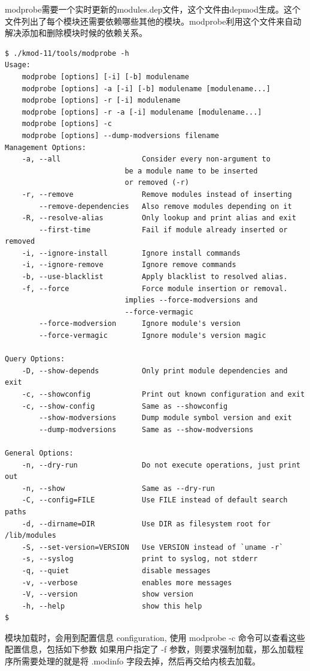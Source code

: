 modprobe需要一个实时更新的modules.dep文件，这个文件由depmod生成。这个文件列出了每个模块还需要依赖哪些其他的模块。modprobe利用这个文件来自动解决添加和删除模块时候的依赖关系。

{\begin{shaded}\begin{verbatim}
$ ./kmod-11/tools/modprobe -h
Usage:
    modprobe [options] [-i] [-b] modulename
    modprobe [options] -a [-i] [-b] modulename [modulename...]
    modprobe [options] -r [-i] modulename
    modprobe [options] -r -a [-i] modulename [modulename...]
    modprobe [options] -c
    modprobe [options] --dump-modversions filename
Management Options:
    -a, --all                   Consider every non-argument to
                            be a module name to be inserted
                            or removed (-r)
    -r, --remove                Remove modules instead of inserting
        --remove-dependencies   Also remove modules depending on it
    -R, --resolve-alias         Only lookup and print alias and exit
        --first-time            Fail if module already inserted or removed
    -i, --ignore-install        Ignore install commands
    -i, --ignore-remove         Ignore remove commands
    -b, --use-blacklist         Apply blacklist to resolved alias.
    -f, --force                 Force module insertion or removal.
                            implies --force-modversions and
                            --force-vermagic
        --force-modversion      Ignore module's version
        --force-vermagic        Ignore module's version magic

Query Options:
    -D, --show-depends          Only print module dependencies and exit
    -c, --showconfig            Print out known configuration and exit
    -c, --show-config           Same as --showconfig
        --show-modversions      Dump module symbol version and exit
        --dump-modversions      Same as --show-modversions

General Options:
    -n, --dry-run               Do not execute operations, just print out
    -n, --show                  Same as --dry-run
    -C, --config=FILE           Use FILE instead of default search paths
    -d, --dirname=DIR           Use DIR as filesystem root for /lib/modules
    -S, --set-version=VERSION   Use VERSION instead of `uname -r`
    -s, --syslog                print to syslog, not stderr
    -q, --quiet                 disable messages
    -v, --verbose               enables more messages
    -V, --version               show version
    -h, --help                  show this help
$ 
\end{verbatim}\end{shaded}}
模块加载时，会用到配置信息 configuration, 使用 modprobe -c
命令可以查看这些配置信息，包括如下参数 如果用户指定了 -f
参数，则要求强制加载，那么加载程序所需要处理的就是将 .modinfo
字段去掉，然后再交给内核去加载。

